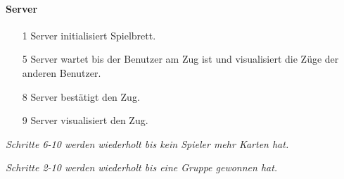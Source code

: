 \documentclass[a4paper,12pt,halfparskip,DIV14]{scrartcl}
\begin{document}
\begin{multicols}{3}
\paragraph{Server}
\begin{enumerate}
	\item[1] Server initialisiert Spielbrett.
	\item[] \vspace{1 \lineheight}
	\item[] \vspace{2 \lineheight}
	\item[] \vspace{2 \lineheight}
	\item[5] Server wartet bis der Benutzer am Zug ist und visualisiert die Züge der anderen Benutzer.
	\item[] \vspace{3 \lineheight}
	\item[] \vspace{2 \lineheight}
	\item[8] Server bestätigt den Zug.
	\item[9] Server visualisiert den Zug.
\end{enumerate}
\end{multicols}

\emph{Schritte 6-10 werden wiederholt bis kein Spieler mehr Karten hat.}

\emph{Schritte 2-10 werden wiederholt bis eine Gruppe gewonnen hat.}
\end{document}

